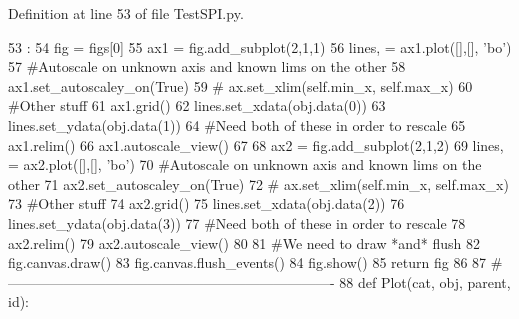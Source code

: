 Definition at line 53 of file TestSPI.py.


\begin{DoxyCode}
53                           :
54     fig = figs[0]
55     ax1 = fig.add_subplot(2,1,1)
56     lines, = ax1.plot([],[], 'bo')
57     #Autoscale on unknown axis and known lims on the other
58     ax1.set_autoscaley_on(True)
59 #    ax.set_xlim(self.min_x, self.max_x)
60     #Other stuff
61     ax1.grid()        
62     lines.set_xdata(obj.data(0))
63     lines.set_ydata(obj.data(1))
64     #Need both of these in order to rescale
65     ax1.relim()
66     ax1.autoscale_view()
67 
68     ax2 = fig.add_subplot(2,1,2)
69     lines, = ax2.plot([],[], 'bo')
70     #Autoscale on unknown axis and known lims on the other
71     ax2.set_autoscaley_on(True)
72 #    ax.set_xlim(self.min_x, self.max_x)
73     #Other stuff
74     ax2.grid()        
75     lines.set_xdata(obj.data(2))
76     lines.set_ydata(obj.data(3))
77     #Need both of these in order to rescale
78     ax2.relim()
79     ax2.autoscale_view()
80 
81     #We need to draw *and* flush
82     fig.canvas.draw()
83     fig.canvas.flush_events()
84     fig.show()
85     return fig
86     
87 #----------------------------------------------------------------------
88 
def Plot(cat, obj, parent, id):
\end{DoxyCode}

